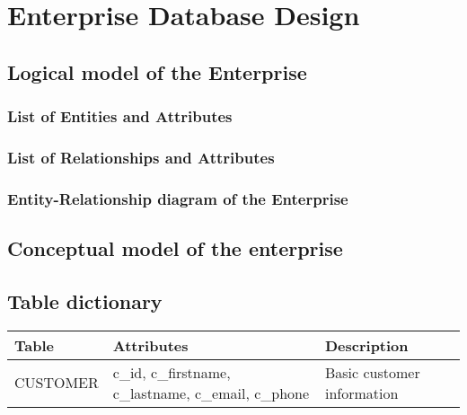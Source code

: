 \documentclass[11pt, a4paper]{report}
\begin{document}
\chapter{Enterprise Database Design}

\section{Logical model of the Enterprise}

\subsection{List of Entities and Attributes}


\clearpage
\subsection{List of Relationships and Attributes}


\clearpage
\subsection{Entity-Relationship diagram of the Enterprise}

\clearpage
\section{Conceptual model of the enterprise}


\clearpage
\section{Table dictionary}

\begin{longtable}{|l|p{4cm}|p{7cm}|}
\hline
\textbf{Table}      & \textbf{Attributes}                                                          & \textbf{Description}                                   \\ \hline

CUSTOMER            & c\_id, c\_firstname, c\_lastname, c\_email, c\_phone                         & Basic customer information                             \\ \hline

\end{longtable}
\end{document}
